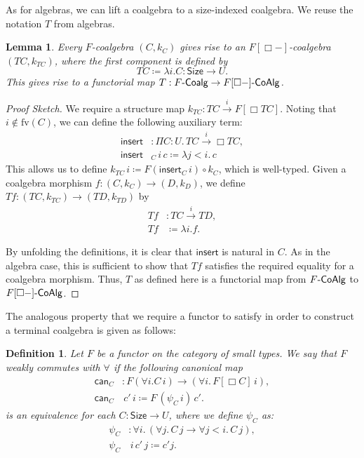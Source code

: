 \documentclass[10pt,a4paper]{article}
\newtheorem{lemma}[theorem]{Lemma}
\newtheorem{definition}[theorem]{Definition}
\theoremstyle{definition}
\theoremstyle{remark}
\renewcommand{\.}{.\,} %
\renewcommand{\:}{:} %
\newcommand{\Size}{\mathsf{Size}}
\newcommand{\F}{F}
\newcommand{\FCoalg}{F\text-\sf{Coalg}}
\newcommand{\sFCoalg}{F[\Box{-}]\text-\sf{CoAlg}}
\newcommand{\sto}{\overset{i}{\to}}
\newcommand{\0}{\mathbf{0}}
\newcommand{\1}{\mathbf{1}}
\newcommand\<\langle
\renewcommand\>\rangle
\renewcommand\sf\mathsf
\newcommand{\U}{U}
\theoremstyle{remark}
\begin{document}
As for algebras, we can lift a coalgebra to a size-indexed coalgebra. We reuse the notation $T$ from algebras.
\begin{lemma}
    Every \( F \)-coalgebra \( (C, k_C) \) gives rise to an \( F[\Box{-}] \)-coalgebra \( (TC, k_{TC}) \), where the first component is defined by 
    \[
        TC \coloneqq \lambda i. C : \Size \to U.
    \] 
This gives rise to a functorial map \( T : \FCoalg \to \sFCoalg \). 
\end{lemma}
\begin{proof}[Proof Sketch]
    We require a structure map \( k_{TC} : TC \sto F[\Box TC]\). Noting that \( i \notin \text{fv}(C) \), we can define the following auxiliary term:
    \begin{align*}
        \mathsf{insert}& : \Pi{C:\U} \. TC \sto \Box TC, \\
        \mathsf{insert}&_C \, i \, c \coloneq  \lambda j < i \. c
    \end{align*}
    This allows us to define $k_{TC} \, i \coloneq  F(\mathsf{insert}_C \, i) \circ k_C$, which is well-typed.
    Given a coalgebra morphism $f : (C, k_C) \to (D, k_D)$, we define $Tf : ({TC}, k_{TC}) \to ({TD}, k_{TD})$ by
    \begin{align*}
        Tf &: TC \sto TD, \\
        Tf & \coloneq  \lambda i . f.
    \end{align*}

    By unfolding the definitions, it is clear that $\mathsf{insert}$ is natural in $C$. As in the algebra case, this is sufficient to show that $Tf$ satisfies the required equality for a coalgebra morphism. Thus, $T$ as defined here is a functorial map from $F\text-\sf{CoAlg}$ to $F[\Box{-}]\text-\sf{CoAlg}$.
\end{proof}

The analogous property that we require a functor to satisfy in order to construct a terminal coalgebra is given as follows:

\begin{definition}
\label{weakly-commute-forall}
    Let $\F$ be a functor on the category of small types. We say that $\F$ \emph{weakly commutes} with $\forall$ if the following canonical map
    \begin{align*}
    \mathsf{can}_C &: \F (\forall i .C \, i) \to (\forall i \. F [\Box C] \, i), \\
    \mathsf{can}_C &\, c' \, i \coloneq  F \, (\psi_C \, i) \, c' .
    \end{align*}
    is an equivalence for each $C : \Size \to \U$, where we define $\psi_C$ as:
    \begin{align*}
        \psi_C &: \forall i \. (\forall j \. C \, j \to \forall j < i \. C \, j), \\
        \psi_C & \, i \, c' \, j \coloneq  c' j.
    \end{align*}
\end{definition}
\end{document}
